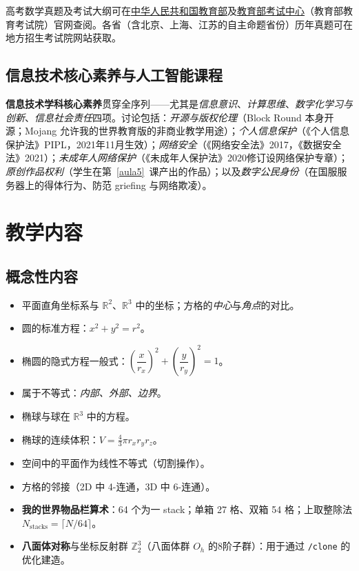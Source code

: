 \documentclass[12pt,a4paper]{scrartcl}
\newcommand{\acc}[1]{\textcolor{accent}{\textbf{#1}}}
\newcommand{\cmd}[1]{\textcolor{earth}{\texttt{\small #1}}}
\begin{document}
高考数学真题及考试大纲可在\href{http://www.moe.gov.cn/}{中华人民共和国教育部}及\href{http://www.neea.edu.cn/}{教育部考试中心}（教育部教育考试院）官网查阅。各省（含北京、上海、江苏的自主命题省份）历年真题可在地方招生考试院网站获取。

\subsection{信息技术核心素养与人工智能课程}

\acc{信息技术学科核心素养}贯穿全序列——尤其是\emph{信息意识}、\emph{计算思维}、\emph{数字化学习与创新}、\emph{信息社会责任}四项。讨论包括：\emph{开源与版权伦理}（Block Round 本身开源；Mojang 允许我的世界教育版的非商业教学用途）；\emph{个人信息保护}（《个人信息保护法》PIPL，2021年11月生效）；\emph{网络安全}（《网络安全法》2017，《数据安全法》2021）；\emph{未成年人网络保护}（《未成年人保护法》2020修订设网络保护专章）；\emph{原创作品权利}（学生在第~\ref{aula5}~课产出的作品）；以及\emph{数字公民身份}（在国服服务器上的得体行为、防范 griefing 与网络欺凌）。

\section{教学内容}\label{sec:conteudos}

\subsection{概念性内容}
\begin{itemize}[leftmargin=1.3em,itemsep=0.15em,topsep=0.3em]
  \item 平面直角坐标系与 $\mathbb{R}^2$、$\mathbb{R}^3$ 中的坐标；方格的\emph{中心}与\emph{角点}的对比。
  \item 圆的标准方程：$x^2 + y^2 = r^2$。
  \item 椭圆的隐式方程一般式：$\left(\dfrac{x}{r_x}\right)^{\!2} + \left(\dfrac{y}{r_y}\right)^{\!2} = 1$。
  \item 属于不等式：\emph{内部、外部、边界}。
  \item 椭球与球在 $\mathbb{R}^3$ 中的方程。
  \item 椭球的连续体积：$V = \tfrac{4}{3}\pi r_x r_y r_z$。
  \item 空间中的平面作为线性不等式（切割操作）。
  \item 方格的邻接（2D 中 4-连通，3D 中 6-连通）。
  \item \acc{我的世界物品栏算术}：64 个为一 stack；单箱 27 格、双箱 54 格；上取整除法 $N_{\mathrm{stacks}} = \lceil N/64 \rceil$。
  \item \acc{八面体对称}与坐标反射群 $\mathbb{Z}_2^3$（八面体群 $O_h$ 的8阶子群）：用于通过 \cmd{/clone} 的优化建造。
\end{itemize}
\end{document}
